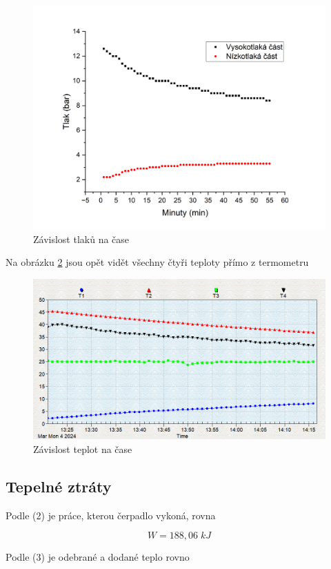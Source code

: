 \begin{figure}[h]
    \centering
    \includegraphics[width=0.68\linewidth]{27 - Tepelné čerpadlo//Protokol_tepelné čerpadlo//img/P(t) vyp.png}
    \caption{Závislost tlaků na čase}
    \label{fig:P(t)-vyp}
\end{figure}

Na obrázku \ref{fig:T(t)-vyp} jsou opět vidět všechny čtyři teploty přímo z termometru

\begin{figure}[h]
    \centering
    \includegraphics[width=0.8\linewidth]{27 - Tepelné čerpadlo//Protokol_tepelné čerpadlo//img/Vyp.png}
    \caption{Závislost teplot na čase}
    \label{fig:T(t)-vyp}
\end{figure}

\subsection{Tepelné ztráty}

Podle (2) je práce, kterou čerpadlo vykoná, rovna

\begin{equation}
    \nonumber
    W = 188,06 \; kJ
\end{equation}

Podle (3) je odebrané a dodané teplo rovno


